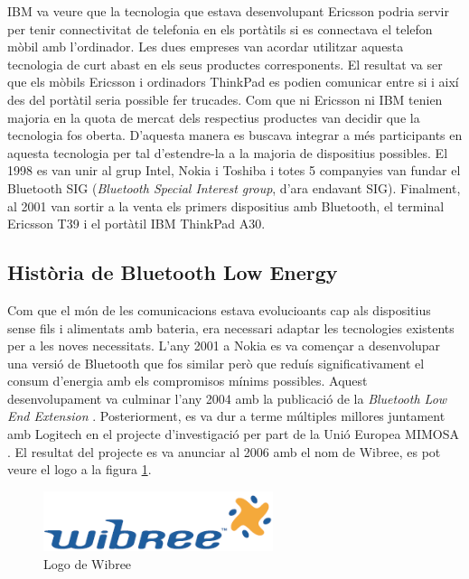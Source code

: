 IBM va veure que la tecnologia que estava desenvolupant Ericsson podria servir per tenir connectivitat de telefonia en els portàtils si es connectava el telefon mòbil amb l'ordinador.
Les dues empreses van acordar utilitzar aquesta tecnologia de curt abast en els seus productes corresponents.
El resultat va ser que els mòbils Ericsson i ordinadors ThinkPad es podien comunicar entre si i així des del portàtil seria possible fer trucades.
Com que ni Ericsson ni IBM tenien majoria en la quota de mercat dels respectius productes van decidir que la tecnologia fos oberta.
D'aquesta manera es buscava integrar a més participants en aquesta tecnologia per tal d'estendre-la a la majoria de dispositius possibles.
El 1998 es van unir al grup Intel, Nokia i Toshiba i totes 5 companyies  van fundar el Bluetooth SIG (\textit{Bluetooth Special Interest group}, d'ara endavant SIG).
Finalment, al 2001 van sortir a la venta els primers dispositius amb Bluetooth, el terminal Ericsson T39 i el portàtil IBM ThinkPad A30.

\subsection{Història de Bluetooth Low Energy}
Com que el món de les comunicacions estava evolucioants cap als dispositius sense fils i alimentats amb bateria, era necessari adaptar les tecnologies existents per a les noves necessitats.
L'any 2001 a Nokia es va començar a desenvolupar una versió de Bluetooth que fos similar però que reduís significativament el consum d'energia amb els compromisos mínims possibles.
Aquest desenvolupament va culminar l'any 2004 amb la publicació de la \textit{Bluetooth Low End Extension} \cite{Original_BLE_Extension}. 
Posteriorment, es va dur a terme múltiples millores juntament amb Logitech en el projecte d'investigació per part de la Unió Europea MIMOSA \cite{MIMOSA}.
El resultat del projecte es va anunciar al 2006 amb el nom de Wibree, es pot veure el logo a la figura \ref{wibree_logo}.

\begin{figure}[hb]
	\begin{center}
		\includegraphics[width=0.6\textwidth]{./images/Wibree_Logo.png}
		\caption{Logo de Wibree}
		\label{wibree_logo}
	\end{center}
\end{figure}

